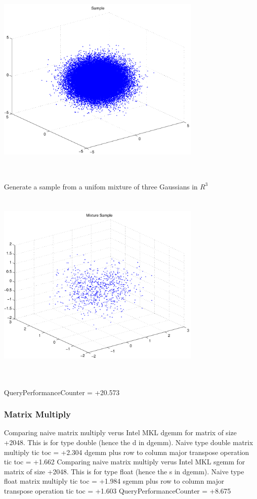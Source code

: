 \documentclass[9pt]{article}
\theoremstyle{plain}
\theoremstyle{definition}
\theoremstyle{remark}
\numberwithin{equation}{section}
\begin{document}
\includegraphics[width=10.0cm,height=10.0cm]{R_3_Normal.pdf}

Generate a sample from a unifom mixture of three Gaussians in $R^3$
\includegraphics[width=10.0cm,height=10.0cm]{R_3_Normal_Mixture.pdf}

QueryPerformanceCounter  =  +20.573
\subsubsection{Matrix Multiply}
Comparing naive matrix multiply verus Intel MKL dgemm for matrix of size +2048.
This is for type double (hence the d in dgemm).
Naive type double matrix multiply tic toc  =  +2.304
dgemm plus row to column major transpose operation tic toc  =  +1.662
Comparing naive matrix multiply verus Intel MKL sgemm for matrix of size +2048.
This is for type float (hence the s in dgemm).
Naive type float matrix multiply tic toc  =  +1.984
sgemm plus row to column major transpose operation tic toc  =  +1.603
QueryPerformanceCounter  =  +8.675
\end{document}
